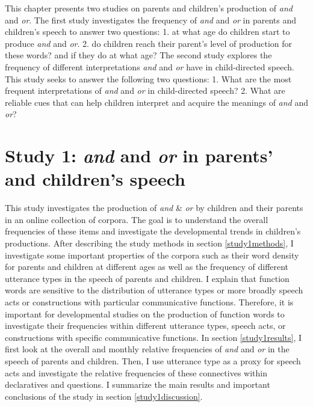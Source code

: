 \documentclass[oneside]{report}
\theoremstyle{definition}
\theoremstyle{definition}
\theoremstyle{definition}
\theoremstyle{remark}
\begin{document}
This chapter presents two studies on parents and children's production
of \emph{and} and \emph{or}. The first study investigates the frequency
of \emph{and} and \emph{or} in parents and children's speech to answer
two questions: 1. at what age do children start to produce \emph{and}
and \emph{or}. 2. do children reach their parent's level of production
for these words? and if they do at what age? The second study explores
the frequency of different interpretations \emph{and} and \emph{or} have
in child-directed speech. This study seeks to answer the following two
questions: 1. What are the most frequent interpretations of \emph{and}
and \emph{or} in child-directed speech? 2. What are reliable cues that
can help children interpret and acquire the meanings of \emph{and} and
\emph{or}?

\section{\texorpdfstring{Study 1: \emph{and} and \emph{or} in parents'
and children's
speech}{Study 1: and and or in parents' and children's speech}}\label{study-1-and-and-or-in-parents-and-childrens-speech}

This study investigates the production of \emph{and} \& \emph{or} by
children and their parents in an online collection of corpora. The goal
is to understand the overall frequencies of these items and investigate
the developmental trends in children's productions. After describing the
study methods in section \ref{study1methods}, I investigate some
important properties of the corpora such as their word density for
parents and children at different ages as well as the frequency of
different utterance types in the speech of parents and children. I
explain that function words are sensitive to the distribution of
utterance types or more broadly speech acts or constructions with
particular communicative functions. Therefore, it is important for
developmental studies on the production of function words to investigate
their frequencies within different utterance types, speech acts, or
constructions with specific communicative functions. In section
\ref{study1results}, I first look at the overall and monthly relative
frequencies of \emph{and} and \emph{or} in the speech of parents and
children. Then, I use utterance type as a proxy for speech acts and
investigate the relative frequencies of these connectives within
declaratives and questions. I summarize the main results and important
conclusions of the study in section \ref{study1discussion}.
\end{document}
